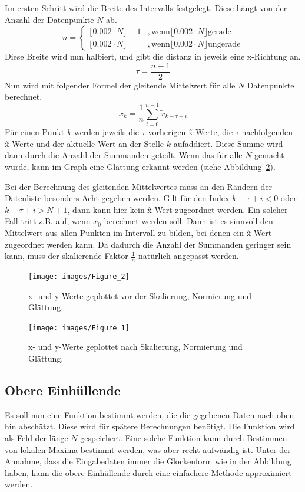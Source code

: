 Im ersten Schritt wird die Breite des Intervalls festgelegt.
Diese hängt von der Anzahl der Datenpunkte $N$ ab.
\[
    n =
    \begin{cases}
        \lfloor0.002 \cdot N \rfloor - 1 & , \text{wenn} \lfloor0.002 \cdot N \rfloor \text{gerade} \\
        \lfloor0.002 \cdot N \rfloor     & , \text{wenn} \lfloor0.002 \cdot N \rfloor \text{ungerade}
    \end{cases}
\]
Diese Breite wird nun halbiert, und gibt die distanz in jeweils eine x-Richtung an.
\[
    \tau = \frac{n - 1}{2}
\]
Nun wird mit folgender Formel der gleitende Mittelwert für alle $N$ Datenpunkte berechnet.
\[
    x_k = \frac{1}{n} \sum_{i = 0}^{n - 1} \tilde{x}_{k-\tau+i}
\]
Für einen Punkt $k$ werden jeweils die $\tau$ vorherigen \~x-Werte, die $\tau$ nachfolgenden \~x-Werte und der aktuelle Wert an der Stelle $k$ aufaddiert.
Diese Summe wird dann durch die Anzahl der Summanden geteilt.
Wenn das für alle $N$ gemacht wurde, kann im Graph eine Glättung erkannt werden (siehe Abbildung~\ref{fig:nach}).

Bei der Berechnung des gleitenden Mittelwertes muss an den Rändern der Datenliste besonders Acht gegeben werden.
Gilt für den Index $k-\tau+i < 0$ oder $k-\tau+i > N + 1$, dann kann hier kein \~x-Wert zugeordnet werden.
Ein solcher Fall tritt z.B. auf, wenn $x_0$ berechnet werden soll.
Dann ist es sinnvoll den Mittelwert aus allen Punkten im Intervall zu bilden, bei denen ein \~x-Wert zugeordnet werden kann.
Da dadurch die Anzahl der Summanden geringer sein kann, muss der skalierende Faktor $\frac{1}{n}$ natürlich angepasst werden.

\begin{figure}[htb]
    \centering
    \texttt{[image: images/Figure\_2]}
    \caption{
        x- und y-Werte geplottet vor der Skalierung, Normierung und Glättung.
    }
    \label{fig:vor-glaett}
\end{figure}

\begin{figure}[htb]
    \centering
    \texttt{[image: images/Figure\_1]}
    \caption{
        x- und y-Werte geplottet nach Skalierung, Normierung und Glättung.
    }
    \label{fig:nach}
\end{figure}

\subsection{Obere Einhüllende}\label{subsec:ober-einh}
Es soll nun eine Funktion bestimmt werden, die die gegebenen Daten nach oben hin abschätzt.
Diese wird für spätere Berechnungen benötigt.
Die Funktion wird als Feld der länge $N$ gespeichert.
Eine solche Funktion kann durch Bestimmen von lokalen Maxima bestimmt werden, was aber recht aufwändig ist.
Unter der Annahme, dass die Eingabedaten immer die Glockenform wie in der Abbildung haben, kann die obere Einhüllende durch eine einfachere Methode approximiert werden.

